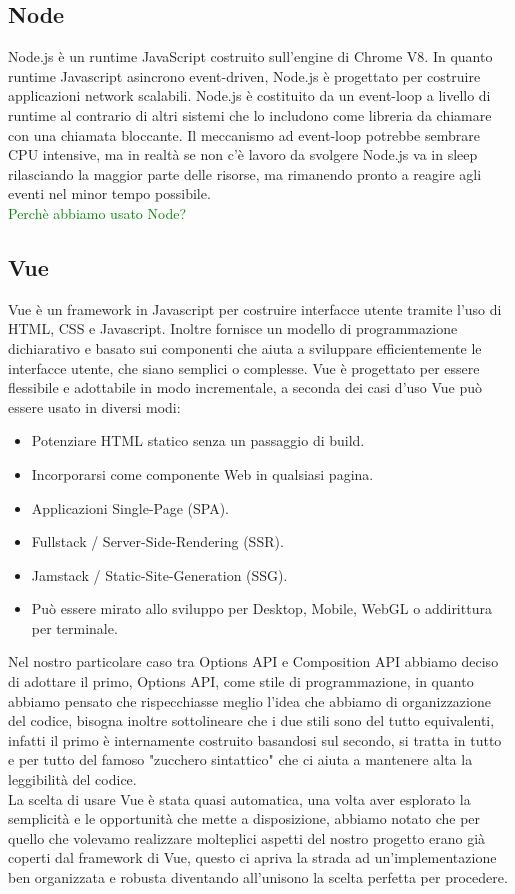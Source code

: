 \documentclass{article}
\begin{document}
\subsection{Node}
Node.js\cite{node} è un runtime JavaScript costruito sull'engine di Chrome V8. In quanto runtime Javascript asincrono event-driven, Node.js è progettato per costruire applicazioni network scalabili. Node.js è costituito da un event-loop a livello di runtime al contrario di altri sistemi che lo includono come libreria da chiamare con una chiamata bloccante. Il meccanismo ad event-loop potrebbe sembrare CPU intensive, ma in realtà se non c'è lavoro da svolgere Node.js va in sleep rilasciando la maggior parte delle risorse, ma rimanendo pronto a reagire agli eventi nel minor tempo possibile.
\\
\textcolor{green}{Perchè abbiamo usato Node?}

\subsection{Vue}
Vue\cite{vue} è un framework in Javascript per costruire interfacce utente tramite l'uso di HTML, CSS e Javascript. Inoltre fornisce un modello di programmazione dichiarativo e basato sui componenti che aiuta a sviluppare efficientemente le interfacce utente, che siano semplici o complesse. Vue è progettato per essere flessibile e adottabile in modo incrementale, a seconda dei casi d'uso Vue può essere usato in diversi modi:
\begin{itemize}
	\item Potenziare HTML statico senza un passaggio di build.
	\item Incorporarsi come componente Web in qualsiasi pagina.
	\item Applicazioni Single-Page (SPA).
	\item Fullstack / Server-Side-Rendering (SSR).
	\item Jamstack / Static-Site-Generation (SSG).
	\item Può essere mirato allo sviluppo per Desktop, Mobile, WebGL o addirittura per terminale.
\end{itemize}
Nel nostro particolare caso tra Options API e Composition API abbiamo deciso di adottare il primo, Options API, come stile di programmazione, in quanto abbiamo pensato che rispecchiasse meglio l'idea che abbiamo di organizzazione del codice, bisogna inoltre sottolineare che i due stili sono del tutto equivalenti, infatti il primo è internamente costruito basandosi sul secondo, si tratta in tutto e per tutto del famoso "zucchero sintattico" che ci aiuta a mantenere alta la leggibilità del codice.\\
La scelta di usare Vue è stata quasi automatica, una volta aver esplorato la semplicità e le opportunità che mette a disposizione, abbiamo notato che per quello che volevamo realizzare molteplici aspetti del nostro progetto erano già coperti dal framework di Vue, questo ci apriva la strada ad un'implementazione ben organizzata e robusta diventando all'unisono la scelta perfetta per procedere.
\end{document}
